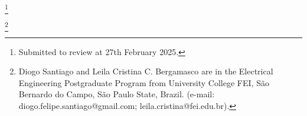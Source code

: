 \thanks{Submitted to review at 27th February 2025.}


\thanks{Diogo Santiago and Leila Cristina C. Bergamasco are in the Electrical Engineering Postgraduate Program from University College FEI, São Bernardo do Campo, São Paulo State, Brazil. (e-mail: diogo.felipe.santiago@gmail.com; leila.cristina@fei.edu.br).}

